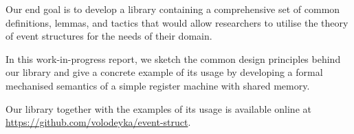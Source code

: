 Our end goal is to develop a \coq library containing 
a comprehensive set of common definitions, lemmas, 
and tactics that would allow researchers 
to utilise the theory of event structures 
for the needs of their domain.

In this work-in-progress report, we sketch 
the common design principles behind our library
and give a concrete example of its usage  
by developing a formal mechanised semantics of a simple 
register machine with shared memory.

Our library together with the examples of 
its usage is available online at \url{https://github.com/volodeyka/event-struct}.  
